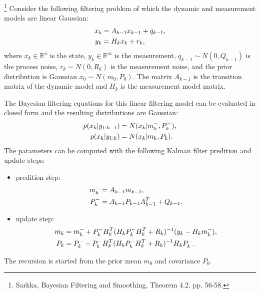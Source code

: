 \begin{theorem} \label{T:kalman}
\footnote{Sarkka, Bayesian Filtering and Smoothing, Theorem 4.2, pp. 56-58.}
Consider the following filtering problem of which the dynamic and measurement 
models are linear Gaussian:
\begin{align}
  x_k &= A_{k-1} x_{k-1} + q_{k-1}, \notag \\
  y_k &= H_k x_k + r_k,
\end{align}
where $x_k\in \mathbb{R}^n$ is the state, $y_k\in\mathbb{R}^m$ is the
measurement, $q_{k-1}\sim N(0,Q_{k-1})$ is the process noise, 
$r_k\sim N(0,R_k)$ is the measurement noise, and the prior distribution is
Gaussian $x_0\sim N(m_0,P_0)$. The matrix $A_{k-1}$ is the transition matrix of
the dynamic model and $H_k$ is the measurement model matrix. 

The Bayesian filtering equations for this linear filtering model can be
evaluated in closed form and the resulting distributions are Gaussian:
\begin{align}
  p(x_k|y_{1:k-1}) &= N(x_k| m_k^-, P_k^-), \notag \\
  p(x_k|y_{1:k}) &= N(x_k| m_k, P_k).
\end{align}
The parameters can be computed with the following Kalman filter predition and
update steps:
\begin{itemize}
\item predition step:
\begin{align}
  m_k^- &= A_{k-1}m_{k-1}, \notag \\
  P_k^- &= A_{k-1} P_{k-1} A_{k-1}^T + Q_{k-1}.
\end{align}
\item update step:
\begin{align}
  m_k &= m_k^- + P_k^- H_k^T (H_k P_k^- H_k^T + R_k)^{-1} (y_k-H_km_k^-), \notag \\
  P_k &= P_k^- - P_k^- H_k^T (H_k P_k^- H_k^T + R_k)^{-1} H_k P_k^-. 
\end{align}
\end{itemize}

The recursion is started from the prior mean $m_0$ and covariance $P_0$.
\end{theorem}
